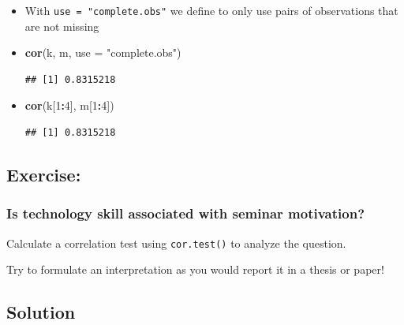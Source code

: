 \documentclass[
]{book}
\newenvironment{Shaded}{\begin{snugshade}}{\end{snugshade}}
\newcommand{\AttributeTok}[1]{\textcolor[rgb]{0.13,0.29,0.53}{#1}}
\newcommand{\DecValTok}[1]{\textcolor[rgb]{0.00,0.00,0.81}{#1}}
\newcommand{\FunctionTok}[1]{\textcolor[rgb]{0.13,0.29,0.53}{\textbf{#1}}}
\newcommand{\NormalTok}[1]{#1}
\newcommand{\SpecialCharTok}[1]{\textcolor[rgb]{0.81,0.36,0.00}{\textbf{#1}}}
\newcommand{\StringTok}[1]{\textcolor[rgb]{0.31,0.60,0.02}{#1}}
\begin{document}
\begin{itemize}
\item
  With \texttt{use\ =\ "complete.obs"} we define to only use pairs of observations that are not missing
\item
\begin{Shaded}
\begin{Highlighting}[]
\FunctionTok{cor}\NormalTok{(k, m, }\AttributeTok{use =} \StringTok{"complete.obs"}\NormalTok{)}
\end{Highlighting}
\end{Shaded}

\begin{verbatim}
## [1] 0.8315218
\end{verbatim}
\item
\begin{Shaded}
\begin{Highlighting}[]
\FunctionTok{cor}\NormalTok{(k[}\DecValTok{1}\SpecialCharTok{:}\DecValTok{4}\NormalTok{], m[}\DecValTok{1}\SpecialCharTok{:}\DecValTok{4}\NormalTok{])}
\end{Highlighting}
\end{Shaded}

\begin{verbatim}
## [1] 0.8315218
\end{verbatim}
\end{itemize}

\subsection{Exercise:}\label{exercise-8}

\subsubsection{\texorpdfstring{Is technology skill associated with seminar motivation? }{Is technology skill associated with seminar motivation?  }}\label{is-technology-skill-associated-with-seminar-motivation}

Calculate a correlation test using \texttt{cor.test()} to analyze the question.

Try to formulate an interpretation as you would report it in a thesis or paper!

\subsection{\texorpdfstring{Solution }{Solution  }}\label{solution-12}
\end{document}
